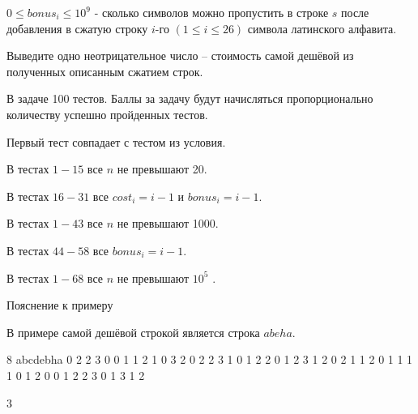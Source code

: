 $0 \le bonus_{i} \le 10^{9}$ - сколько символов можно пропустить в строке $s$ после добавления в сжатую строку $i$-го 
$(1 \le i \le 26)$ символа латинского алфавита.

\outputfmtSection

Выведите одно неотрицательное число – стоимость самой дешёвой из полученных описанным сжатием строк.

\markSection

В задаче 100 тестов. Баллы за задачу будут начисляться пропорционально количеству успешно пройденных тестов.

Первый тест совпадает с тестом из условия.

В тестах $1-15$ все $n$ не превышают 20.

В тестах $16-31$ все $cost_{i} = i - 1$ и $bonus_{i} = i - 1$.

В тестах $1 - 43$ все $n$ не превышают 1000.

В тестах $44 - 58$ все $bonus_{i} = i - 1$.

В тестах $1 - 68$ все $n$ не превышают $10^{5}$ .

Пояснение к примеру

В примере самой дешёвой строкой является строка $abeha$.


\begin{myverbbox}[\small]{\vinput}
    8
    abcdebha
    0 2 2 3 0 0 1 1 2 1 0 3 2 0 2 2 3 1 0 1 2 2 0 1 2 3
    1 2 0 2 1 1 2 0 1 1 1 1 0 1 2 0 0 1 2 2 3 0 1 3 1 2
\end{myverbbox}
\begin{myverbbox}[\small]{\voutput}
    3
\end{myverbbox}

